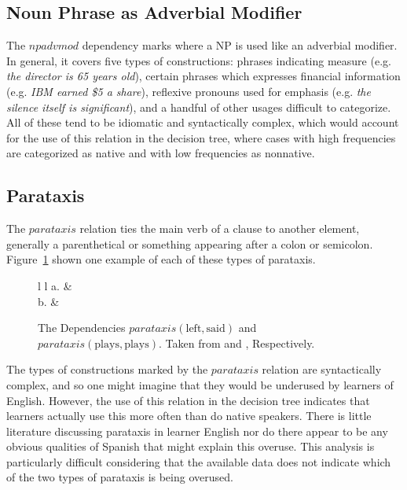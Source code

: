 \documentclass[main.tex]{subfiles}
\begin{document}
\subsection{Noun Phrase as Adverbial Modifier}

The $npadvmod$ dependency marks where a NP is used like an adverbial modifier. In general, it covers five types of constructions: phrases indicating measure (e.g. \textit{the director is 65 years old}), certain phrases which expresses financial information (e.g. \textit{IBM earned \$5 a share}), reflexive pronouns used for emphasis (e.g. \textit{the silence itself is significant}), and a handful of other usages difficult to categorize. All of these tend to be idiomatic and syntactically complex, which would account for the use of this relation in the decision tree, where cases with high frequencies are categorized as native and with low frequencies as nonnative.

\subsection{Parataxis}

The $parataxis$ relation ties the main verb of a clause to another element, generally a parenthetical or something appearing after a colon or semicolon. Figure~\ref{fig:parataxis} shown one example of each of these types of parataxis.
\begin{figure}[htbp]
\centering
\begin{tabular}{ l l }
a. & \\
b. & \\
\end{tabular}
\caption[The Dependencies $parataxis(\text{left}, \text{said})$ and $parataxis(\text{plays}, \text{plays})$]{The Dependencies $parataxis(\text{left}, \text{said})$ and $parataxis(\text{plays}, \text{plays})$. Taken from \citet{typed-deps-manual} and \citet[p. 921]{quirk:1985}, Respectively.}
\label{fig:parataxis}
\end{figure}
The types of constructions marked by the $parataxis$ relation are syntactically complex, and so one might imagine that they would be underused by learners of English. However, the use of this relation in the decision tree indicates that learners actually use this more often than do native speakers. There is little literature discussing parataxis in learner English nor do there appear to be any obvious qualities of Spanish that might explain this overuse. This analysis is particularly difficult considering that the available data does not indicate which of the two types of parataxis is being overused.
\end{document}
